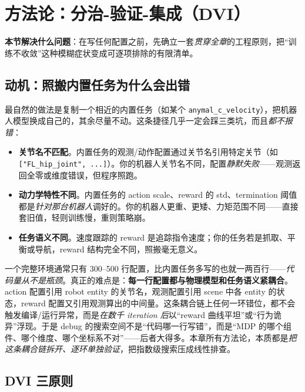 \section{方法论：分治-验证-集成（DVI）}
\label{sec:rlmc-diy-dvi}

\textbf{本节解决什么问题}：在写任何配置之前，先确立一套\emph{贯穿全章}的工程原则，把“训练不收敛”这种模糊症状变成可逐项排除的有限清单。

\subsection{动机：照搬内置任务为什么会出错}
\label{sec:rlmc-diy-dvi-motivation}

最自然的做法是复制一个相近的内置任务（如某个 \texttt{anymal\_c\_velocity}），把机器人模型换成自己的，其余尽量不动。这条捷径几乎一定会踩三类坑，而且\emph{都不报错}：

\begin{itemize}
\item \textbf{关节名不匹配}。内置任务的观测/动作配置通过关节名引用特定关节（如 \verb|["FL_hip_joint", ...]|）。你的机器人关节名不同，配置\emph{静默失败}——观测返回全零或维度错误，但程序照跑。
\item \textbf{动力学特性不同}。内置任务的 action scale、reward 的 std、termination 阈值都是\emph{针对那台机器人}调好的。你的机器人更重、更矮、力矩范围不同——直接套旧值，轻则训练慢，重则策略崩。
\item \textbf{任务语义不同}。速度跟踪的 reward 是追踪指令速度；你的任务若是抓取、平衡或导航，reward 结构完全不同，照搬毫无意义。
\end{itemize}

\begin{insight}\label{ins:rlmc-diy-coupling}
一个完整环境通常只有 300--500 行配置，比内置任务多写的也就一两百行——\emph{代码量从不是瓶颈}。真正的难点是：\textbf{每一行配置都与物理模型和任务语义紧耦合}。action 配置引用 robot entity 的关节名，观测配置引用 scene 中各 entity 的状态，reward 配置又引用观测算出的中间量。这条耦合链上任何一环错位，都不会触发编译/运行异常，而是\emph{在数千 iteration 后}以“reward 曲线平坦”或“行为诡异”浮现。于是 debug 的搜索空间不是“代码哪一行写错”，而是“MDP 的哪个组件、哪个维度、哪个坐标系不对”——后者大得多。本章所有方法论，本质都是\emph{把这条耦合链拆开、逐环单独验证}，把指数级搜索压成线性排查。
\end{insight}

\subsection{DVI 三原则}
\label{sec:rlmc-diy-dvi-three}

